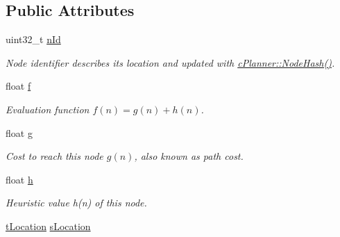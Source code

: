 \subsection*{Public Attributes}
\begin{DoxyCompactItemize}
\item 
\mbox{\label{structplanner_1_1t_node_ae4b20cbcf754ea9e73e8ddc6044db0b2}} 
uint32\+\_\+t \mbox{\hyperlink{structplanner_1_1t_node_ae4b20cbcf754ea9e73e8ddc6044db0b2}{n\+Id}}
\begin{DoxyCompactList}\small\item\em Node identifier describes its location and updated with \mbox{\hyperlink{classplanner_1_1c_planner_a5ae4464a4d418cda71f4a8133d592c93}{c\+Planner\+::\+Node\+Hash()}}. \end{DoxyCompactList}\item 
\mbox{\label{structplanner_1_1t_node_ad02a69af312bcc43a9487d2ee09bb2a0}} 
float \mbox{\hyperlink{structplanner_1_1t_node_ad02a69af312bcc43a9487d2ee09bb2a0}{f}}
\begin{DoxyCompactList}\small\item\em Evaluation function $f(n) = g(n) + h(n)$. \end{DoxyCompactList}\item 
\mbox{\label{structplanner_1_1t_node_a1cb2b4b2b8eb500d015d1aebd37499ae}} 
float \mbox{\hyperlink{structplanner_1_1t_node_a1cb2b4b2b8eb500d015d1aebd37499ae}{g}}
\begin{DoxyCompactList}\small\item\em Cost to reach this node $g(n)$, also known as path cost. \end{DoxyCompactList}\item 
\mbox{\label{structplanner_1_1t_node_afabc13f803a1548f5875467350666168}} 
float \mbox{\hyperlink{structplanner_1_1t_node_afabc13f803a1548f5875467350666168}{h}}
\begin{DoxyCompactList}\small\item\em Heuristic value h(n) of this node. \end{DoxyCompactList}\item 
\mbox{\label{structplanner_1_1t_node_af13cb3b665f2c03c8b9c764d3fd42b4b}} 
\mbox{\hyperlink{structplanner_1_1t_location}{t\+Location}} \mbox{\hyperlink{structplanner_1_1t_node_af13cb3b665f2c03c8b9c764d3fd42b4b}{s\+Location}}

\end{DoxyCompactItemize}
